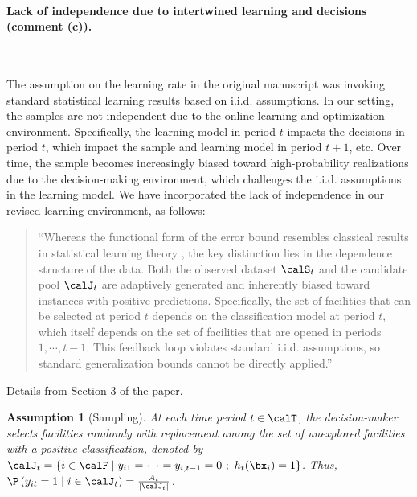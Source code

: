 \documentclass[11pt]{article}
\newtheorem{assumption}{Assumption}[]
\begin{document}
\paragraph{Lack of independence due to intertwined learning and decisions (comment (c)).}\

The assumption on the learning rate in the original manuscript was invoking standard statistical learning results based on i.i.d. assumptions. In our setting, the samples are not independent due to the online learning and optimization environment. Specifically, the learning model in period $t$ impacts the decisions in period $t$, which impact the sample and learning model in period $t+1$, etc. Over time, the sample becomes increasingly biased toward high-probability realizations due to the decision-making environment, which challenges the i.i.d. assumptions in the learning model. We have incorporated the lack of independence in our revised learning environment, as follows:
\begin{quote}
    ``Whereas the functional form of the error bound resembles classical results in statistical learning theory \citep{boucheron2005theory, vapnik2015uniform, bousquet2002stability, feldman2019high}, the key distinction lies in the dependence structure of the data. Both the observed dataset $\calS_t$ and the candidate pool $\calJ_t$ are adaptively generated and inherently biased toward instances with positive predictions. Specifically, the set of facilities that can be selected at period $t$ depends on the classification model at period $t$, which itself depends on the set of facilities that are opened in periods $1,\cdots,t-1$. This feedback loop violates standard i.i.d. assumptions, so standard generalization bounds cannot be directly applied.''
\end{quote}

\underline{Details from Section 3 of the paper.}
\setcounter{assumption}{2}
\begin{assumption}[Sampling]\label{ass:sampling_AE}
    At each time period $t\in\calT$, the decision-maker selects facilities randomly with replacement among the set of unexplored facilities with a positive classification, denoted by $\calJ_t=\{i\in\calF\mid y_{i1}=\cdots=y_{i,t-1}=0\ ;\ h_t(\bx_{i})=1\}$. Thus, $\P\left(y_{it}=1 \mid i \in \calJ_t\right)= 
    \frac{A_t}{|\calJ_t|}$.
\end{assumption}
\end{document}
